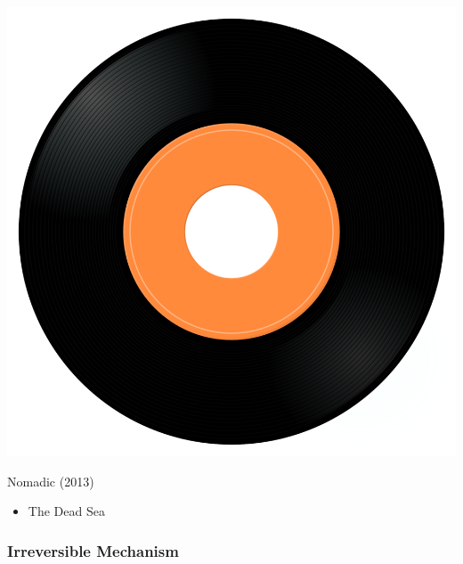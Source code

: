 \begin{minipage}[t]{0.25\textwidth}\vspace{0pt}
\captionsetup{type=figure}
\includegraphics[width=\textwidth]{Images/cover.png}
\caption*{Nomadic (2013)}
\end{minipage}
\begin{minipage}[t]{0.25\textwidth}\vspace{0pt}
\begin{itemize}[nosep,leftmargin=1em,labelwidth=*,align=left]
	\setlength{\itemsep}{0pt}
	\item The Dead Sea
\end{itemize}
\end{minipage}

\subsubsection{Irreversible Mechanism}

